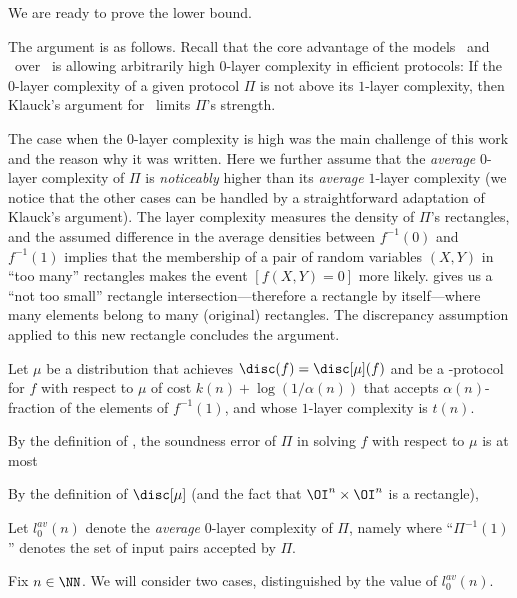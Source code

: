 We are ready to prove the lower bound.

The argument is as follows.
Recall that the core advantage of the models \LAM\ and \SLAM\ over \MA\ is allowing arbitrarily high $0$-layer complexity in efficient protocols:
If the $0$-layer complexity of a given protocol $\Pi$ is not above its $1$-layer complexity, then Klauck's argument for \MA\ limits $\Pi$'s strength.

The case when the $0$-layer complexity is high was the main challenge of this work and the reason why it was written.
Here we further assume that the \emph{average} $0$-layer complexity of $\Pi$ is \emph{noticeably} higher than its \emph{average} $1$-layer complexity (we notice that the other cases can be handled by a straightforward adaptation of Klauck's argument).
The layer complexity measures the density of $\Pi$'s rectangles, and the assumed difference in the average densities between $f^{-1}(0)$ and $f^{-1}(1)$ implies that the membership of a pair of random variables $(X, Y)$ in ``too many'' rectangles makes the event $[f(X, Y)=0]$ more likely.
 gives us a ``not too small'' rectangle intersection---therefore a rectangle by itself---where many elements belong to many (original) rectangles. 
The discrepancy assumption applied to this new rectangle concludes the argument.

Let $\mu$ be a distribution that achieves $\disc(f) = \disc[\mu](f)$ and
%
%
%
be a \SLAM-protocol for $f$ with respect to $\mu$ of cost $k(n)+\log(1/{\alpha(n)})$
%
that accepts $\alpha(n)$-fraction of the elements of $f^{-1}(1)$, and whose $1$-layer complexity is $t(n)$.

By the definition of \SLAM, the soundness error of $\Pi$ in solving $f$ with respect to $\mu$ is at most

By the definition of $\disc[\mu]$ (and the fact that $\OI^n\times\OI^n$ is a rectangle),

Let $l_0^{av}(n)$ denote the \emph{average} $0$-layer complexity of $\Pi$, namely
where ``$\Pi^{-1}(1)$'' denotes the set of input pairs accepted by $\Pi$.

Fix $n\in\NN$.
We will consider two cases, distinguished by the value of $l_0^{av}(n)$.

